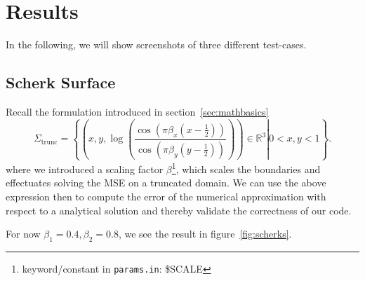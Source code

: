 \documentclass[11pt]{scrartcl}
\begin{document}
\section{Results}
In the following, we will show screenshots of three different test-cases.


\subsection{Scherk Surface}\label{sec:scherkolm}
Recall the formulation introduced in section~\ref{sec:mathbasics}
\begin{equation}
\Sigma_{\text{trunc}} = \left\{ \left. \left(x, y, \log \left( \frac{\cos (\pi\beta_x(x-\frac{1}{2}))}{\cos (\pi\beta_y(y-\frac{1}{2}))} \right) \right) \in \mathbb{R}^{3} \right  | 0 < x, y < 1 \right\}.
\end{equation} 
where we introduced a scaling factor $\beta$\footnote{keyword/constant in \texttt{params.in}: \$SCALE}, which scales the boundaries and effectuates solving the MSE on a truncated domain. We can use the above expression then to compute the error of the numerical approximation with respect to a analytical solution and thereby validate the correctness of our code. 

For now $\beta_1=0.4, \beta_2=0.8$, we see the result in figure~\ref{fig:scherks}.
\end{document}
